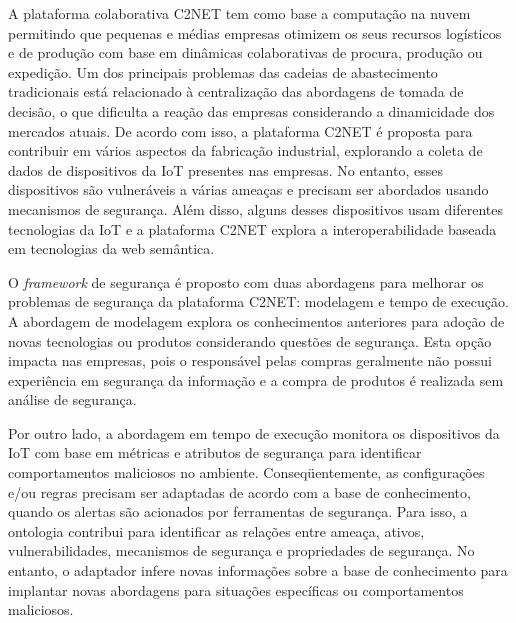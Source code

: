 \documentclass[tid,table]{texufpel} %
\begin{document}
A plataforma colaborativa C2NET tem como base a computação na nuvem permitindo que pequenas e médias empresas otimizem os seus recursos logísticos e de produção com base em dinâmicas colaborativas de procura, produção ou expedição. Um dos principais problemas das cadeias de abastecimento tradicionais está relacionado à centralização das abordagens de tomada de decisão, o que dificulta a reação das empresas considerando a dinamicidade dos mercados atuais. De acordo com isso, a plataforma C2NET é proposta para contribuir em vários aspectos da fabricação industrial, explorando a coleta de dados de dispositivos da IoT presentes nas empresas. No entanto, esses dispositivos são vulneráveis a várias ameaças e precisam ser abordados usando mecanismos de segurança. Além disso, alguns desses dispositivos usam diferentes tecnologias da IoT e a plataforma C2NET explora a interoperabilidade baseada em tecnologias da web semântica.

O \textit{framework} de segurança é proposto com duas abordagens para melhorar os problemas de segurança da plataforma C2NET: modelagem e tempo de execução. A abordagem de modelagem explora os conhecimentos anteriores para adoção de novas tecnologias ou produtos considerando questões de segurança. Esta opção impacta nas empresas, pois o responsável pelas compras geralmente não possui experiência em segurança da informação e a compra de produtos é realizada sem análise de segurança.

Por outro lado, a abordagem em tempo de execução monitora os dispositivos da IoT com base em métricas e atributos de segurança para identificar comportamentos maliciosos no ambiente. Conseqüentemente, as configurações e/ou regras precisam ser adaptadas de acordo com a base de conhecimento, quando os alertas são acionados por ferramentas de segurança. Para isso, a ontologia contribui para identificar as relações entre ameaça, ativos, vulnerabilidades, mecanismos de segurança e propriedades de segurança. No entanto, o adaptador infere novas informações sobre a base de conhecimento para implantar novas abordagens para situações específicas ou comportamentos maliciosos.
\end{document}
